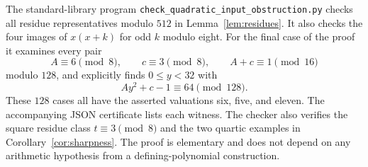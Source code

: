 \documentclass[11pt,a4paper]{article}
\begin{document}
The standard-library program
\nolinkurl{check_quadratic_input_obstruction.py}
checks all residue representatives modulo $512$ in
Lemma~\ref{lem:residues}. It also checks the four images of
$x(x+k)$ for odd $k$ modulo eight.
For the final case of the proof it examines every pair
\[
 A\equiv6\pmod8,\qquad c\equiv3\pmod8,\qquad
 A+c\equiv1\pmod{16}
\]
modulo $128$, and explicitly finds $0\le y<32$ with
\[
                     Ay^2+c-1\equiv64\pmod{128}.
\]
These $128$ cases all have the asserted valuations six, five,
and eleven. The accompanying JSON certificate lists each witness.
The checker also verifies the square residue class $t\equiv3\pmod8$
and the two quartic examples in Corollary~\ref{cor:sharpness}.
The proof is elementary and does not depend on any arithmetic
hypothesis from a defining-polynomial construction.
\end{document}

